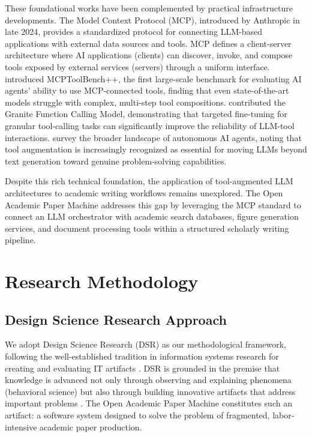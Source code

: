 \documentclass{article}
\begin{document}
These foundational works have been complemented by practical infrastructure developments. The Model Context Protocol (MCP), introduced by Anthropic in late 2024, provides a standardized protocol for connecting LLM-based applications with external data sources and tools. MCP defines a client-server architecture where AI applications (clients) can discover, invoke, and compose tools exposed by external services (servers) through a uniform interface. \citet{fan2025mcptoolbench} introduced MCPToolBench++, the first large-scale benchmark for evaluating AI agents' ability to use MCP-connected tools, finding that even state-of-the-art models struggle with complex, multi-step tool compositions. \citet{abdelaziz2024granite} contributed the Granite Function Calling Model, demonstrating that targeted fine-tuning for granular tool-calling tasks can significantly improve the reliability of LLM-tool interactions. \citet{ferrag2025llm_agents} survey the broader landscape of autonomous AI agents, noting that tool augmentation is increasingly recognized as essential for moving LLMs beyond text generation toward genuine problem-solving capabilities.

Despite this rich technical foundation, the application of tool-augmented LLM architectures to academic writing workflows remains unexplored. The Open Academic Paper Machine addresses this gap by leveraging the MCP standard to connect an LLM orchestrator with academic search databases, figure generation services, and document processing tools within a structured scholarly writing pipeline.


\section{Research Methodology}

\subsection{Design Science Research Approach}

We adopt Design Science Research (DSR) as our methodological framework, following the well-established tradition in information systems research for creating and evaluating IT artifacts \citep{hevner2004design}. DSR is grounded in the premise that knowledge is advanced not only through observing and explaining phenomena (behavioral science) but also through building innovative artifacts that address important problems \citep{hevner2004design}. The Open Academic Paper Machine constitutes such an artifact: a software system designed to solve the problem of fragmented, labor-intensive academic paper production.
\end{document}
